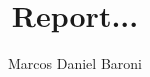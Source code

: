 \documentclass{article}
\title{Report...}
\author{Marcos Daniel Baroni}
\begin{document}
\maketitle

\section{}
\section{}
\section{}



\end{document}
